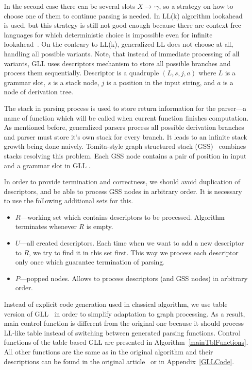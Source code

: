 In the second case there can be several slots $X \rightarrow \cdot \gamma$, so a strategy on how to choose one of them to continue parsing is needed.
In LL(k) algorithm lookahead is used, but this strategy is still not good enough because there are context-free languages for which deterministic choice is impossible even for infinite lookahead~\cite{LLnonLL}.
On the contrary to LL(k), generalized LL does not choose at all, handling all possible variants.
Note, that instead of immediate processing of all variants, GLL uses descriptors mechanism to store all possible branches and process them sequentially. 
Descriptor is a quadruple $(L, s, j, a)$ where $L$ is a grammar slot, $s$ is a stack node, $j$ is a position in the input string, and $a$ is a node of derivation tree. 

The stack in parsing process is used to store return information for the parser---a name of function which will be called when current function finishes computation. 
As mentioned before, generalized parsers process all possible derivation branches and parser must store it's own stack for every branch. 
It leads to an infinite stack growth being done naively.  
Tomita-style graph structured stack (GSS)~\cite{Tomita} combines stacks resolving this problem.
Each GSS node contains a pair of position in input and a grammar slot in GLL . 

In order to provide termination and correctness, we should avoid duplication of descriptors, and be able to process GSS nodes in arbitrary order. It is necessary to use the following additional sets for this.
\begin{itemize}
\item $R$---working set which contains descriptors to be processed. Algorithm terminates whenever $R$ is empty.
\item $U$---all created descriptors. Each time when we want to add a new descriptor to $R$, we try to find it in this set first.
This way we process each descriptor only once which guarantee termination of parsing.
\item $P$---popped nodes. Allows to process descriptors (and GSS nodes) in arbitrary order. 
\end{itemize}

Instead of explicit code generation used in classical algorithm, we use table version of GLL~\cite{TableGLL} in order to simplify adaptation to graph processing.
As a result, main control function is different from the original one because it should process LL-like table instead of switching between generated parsing functions.
Control functions of the table based GLL are presented in Algorithm~\ref{mainTblFunctions}.
All other functions are the same as in the original algorithm and their descriptions can be found in the original article~\cite{scott2010gll} or in Appendix~\ref{GLLCode}.

